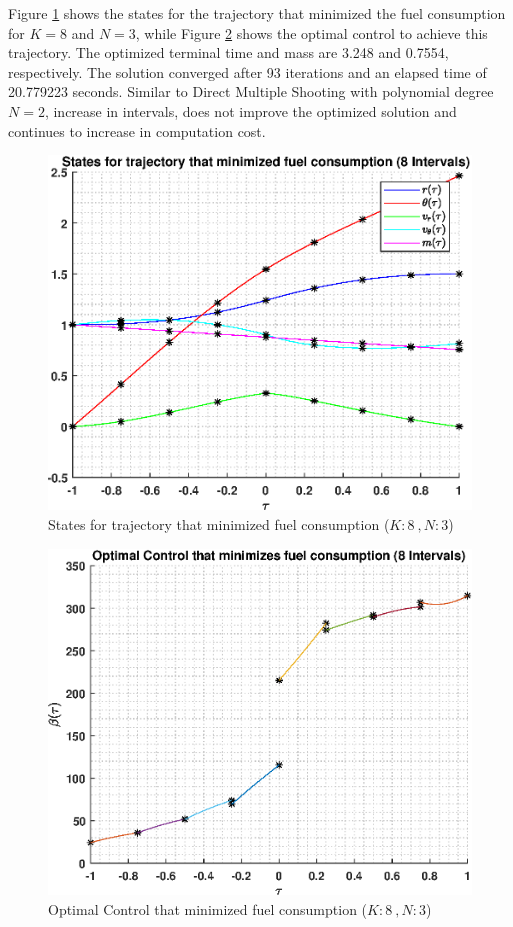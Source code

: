 \documentclass[]{article}
\begin{document}
\vspace{2mm}\newline 
Figure \ref{fig:directStatesK8Poly3} shows the states for the trajectory that minimized the fuel consumption for \(K = 8\) and  \(N = 3\), while Figure \ref{fig:directControlK8Poly3} shows the optimal control to achieve this trajectory. The optimized terminal time and mass are 3.248 and 0.7554, respectively. The solution converged after 93 iterations and an elapsed time of 20.779223 seconds. Similar to Direct Multiple Shooting with polynomial degree \(N = 2\), increase in intervals, does not improve the optimized solution and continues to increase in computation cost.
\begin{figure}
	\centering
	\includegraphics[scale=0.75]{directStatesK8Poly3.eps}
	\caption{States for trajectory that minimized fuel consumption (\(K:8\ , N:3\))}
	\label{fig:directStatesK8Poly3}
\end{figure}
\begin{figure}
	\centering
	\includegraphics[scale=0.75]{directControlK8Poly3.eps}
	\caption{Optimal Control that minimized fuel consumption (\(K:8\ , N:3\))}
	\label{fig:directControlK8Poly3}
\end{figure}
\end{document}
